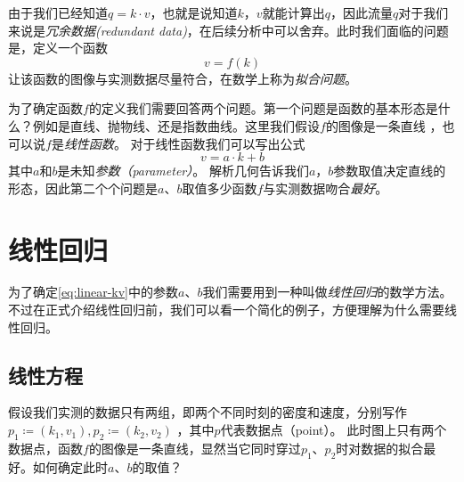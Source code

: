 由于我们已经知道$q=k\cdot v$，也就是说知道$k$，$v$就能计算出$q$，因此流量$q$对于我们来说是\emph{冗余数据(redundant data)}，在后续分析中可以舍弃。此时我们面临的问题是，定义一个函数
\begin{equation}
    v=f(k)
\end{equation}
让该函数的图像与实测数据尽量符合，在数学上称为\emph{拟合问题}。

为了确定函数$f$的定义我们需要回答两个问题。第一个问题是函数的基本形态是什么？例如是直线、抛物线、还是指数曲线。这里我们假设$f$的图像是一条直线
，也可以说$f$是\emph{线性函数}。
对于线性函数我们可以写出公式
\begin{equation}\label{eq:linear-kv}
    v = a\cdot k + b
\end{equation}
其中$a$和$b$是未知\emph{参数（parameter）}。
解析几何告诉我们$a$，$b$参数取值决定直线的形态，因此第二个个问题是$a$、$b$取值多少函数$f$与实测数据吻合\emph{最好}。

\section{线性回归}
为了确定\cref{eq:linear-kv}中的参数$a$、$b$我们需要用到一种叫做\emph{线性回归}的数学方法。
不过在正式介绍线性回归前，我们可以看一个简化的例子，方便理解为什么需要线性回归。

\subsection{线性方程}

假设我们实测的数据只有两组，即两个不同时刻的密度和速度，分别写作$p_1\coloneqq(k_1, v_1), p_2\coloneqq(k_2, v_2)$
，其中$p$代表数据点（point）。
此时图上只有两个数据点，函数$f$的图像是一条直线，显然当它同时穿过$p_1$、$p_2$时对数据的拟合最好。如何确定此时$a$、$b$的取值？

